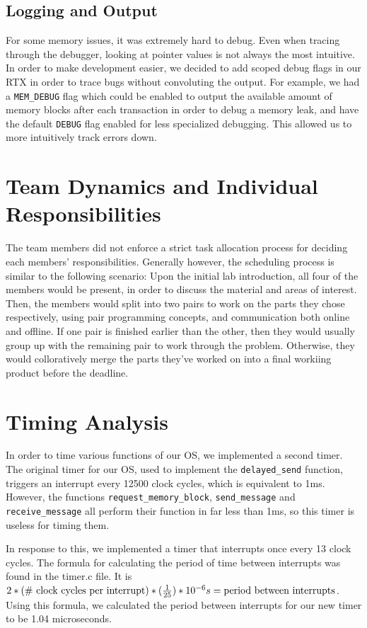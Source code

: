 \documentclass[12pt]{report}
\begin{document}
\section{Logging and Output}
For some memory issues, it was extremely hard to debug. Even when tracing through the debugger, looking at pointer values is not always the most intuitive. In order to make development easier, we decided to add scoped debug flags in our RTX in order to trace bugs without convoluting the output. For example, we had a \texttt{MEM_DEBUG} flag which could be enabled to output the available amount of memory blocks after each transaction in order to debug a memory leak, and have the default \texttt{DEBUG} flag enabled for less specialized debugging. This allowed us to more intuitively track errors down.

\chapter{Team Dynamics and Individual Responsibilities}
The team members did not enforce a strict task allocation process for deciding each members' responsibilities. Generally however, the scheduling process is similar to the following scenario:
Upon the initial lab introduction, all four of the members would be present, in order to discuss the material and areas of interest. Then, the members would split into two pairs to work on the parts they chose respectively, using pair programming concepts, and communication both online and offline. If one pair is finished earlier than the other, then they would usually group up with the remaining pair to work through the problem. Otherwise, they would colloratively merge the parts they've worked on into a final workiing product before the deadline.

\chapter{Timing Analysis}

In order to time various functions of our OS, we implemented a second timer.  The original timer for our OS, used to implement the \texttt{delayed_send} function, triggers an interrupt every 12500 clock cycles, which is equivalent to 1ms.  However, the functions \texttt{request_memory_block}, \texttt{send_message} and \texttt{receive_message} all perform their function in far less than 1ms, so this timer is useless for timing them.

In response to this, we implemented a timer that interrupts once every 13 clock cycles.  The formula for calculating the period of time between interrupts was found in the timer.c file.  It is $2*(\textnormal{\# clock cycles per interrupt})*(\frac{1}{25}) * 10^{-6} s = \textnormal{period between interrupts}$.  Using this formula, we calculated the period between interrupts for our new timer to be 1.04 microseconds.
\end{document}
